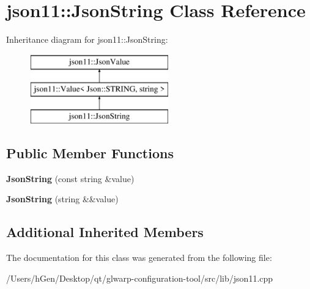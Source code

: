 \hypertarget{classjson11_1_1_json_string}{}\section{json11\+:\+:Json\+String Class Reference}
\label{classjson11_1_1_json_string}
Inheritance diagram for json11\+:\+:Json\+String\+:\begin{figure}[H]
\begin{center}
\leavevmode
\includegraphics[height=3.000000cm]{classjson11_1_1_json_string}
\end{center}
\end{figure}
\subsection*{Public Member Functions}
\begin{DoxyCompactItemize}
\item 
\mbox{\label{classjson11_1_1_json_string_a367de25bb5eae5a41abea569646eca12}} 
{\bfseries Json\+String} (const string \&value)
\item 
\mbox{\label{classjson11_1_1_json_string_a4c2722034ef127dae2573025e6b606b6}} 
{\bfseries Json\+String} (string \&\&value)
\end{DoxyCompactItemize}
\subsection*{Additional Inherited Members}


The documentation for this class was generated from the following file\+:\begin{DoxyCompactItemize}
\item 
/\+Users/h\+Gen/\+Desktop/qt/glwarp-\/configuration-\/tool/src/lib/json11.\+cpp\end{DoxyCompactItemize}
